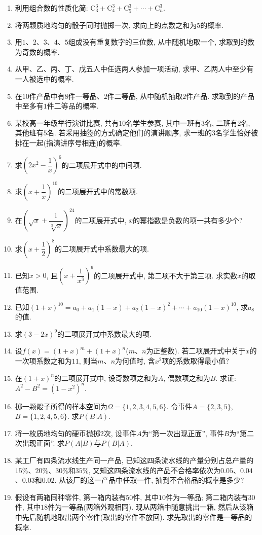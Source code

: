 \documentclass[10pt,a4paper]{article}
\begin{document}
\begin{enumerate}[1.]
\item 利用组合数的性质化简: $\mathrm{C}_3^3+\mathrm{C}_4^3+\mathrm{C}_5^3+\cdots+\mathrm{C}_n^3$.
\item 将两颗质地均匀的骰子同时抛掷一次, 求向上的点数之和为$5$的概率.
\item 用$1$、$2$、$3$、$4$、$5$组成没有重复数字的三位数, 从中随机地取一个, 求取到的数为奇数的概率.
\item 从甲、乙、丙、丁、戊五人中任选两人参加一项活动, 求甲、乙两人中至少有一人被选中的概率.
\item 在$10$件产品中有$8$件一等品、$2$件二等品, 从中随机抽取$2$件产品. 求取到的产品中至多有$1$件二等品的概率.
\item 某校高一年级举行演讲比赛, 共有$10$名学生参赛, 其中一班有$3$名, 二班有$2$名, 其他班有$5$名. 若采用抽签的方式确定他们的演讲顺序, 求一班的$3$名学生恰好被排在一起(指演讲序号相连)的概率.
\item 求$(2x^2-\dfrac 1x)^6$的二项展开式中的中间项.
\item 求$(x+\dfrac 1x)^{10}$的二项展开式中的常数项.
\item 在$(\sqrt x+\dfrac 1{\sqrt[3]x})^{24}$的二项展开式中, $x$的幂指数是负数的项一共有多少个? 
\item 求$(x+\dfrac 12)^8$的二项展开式中系数最大的项.
\item 已知$x>0$, 且$(x+\dfrac 1{x^3})^9$的二项展开式中, 第二项不大于第三项. 求实数$x$的取值范围.
\item 已知$(1+x)^{10}=a_0+a_1(1-x)+a_2(1-x)^2+\cdots+a_{10}(1-x)^{10}$, 求$a_8$的值.
\item 求$(3-2x)^9$的二项展开式中系数最大的项.
\item 设$f(x)=(1+x)^m+(1+x)^n$($m$、$n$为正整数). 若二项展开式中关于$x$的一次项系数之和为$11$, 则当$m$、$n$为何值时, 含$x^2$项的系数取得最小值? 
\item 在$(1+x)^n$的二项展开式中, 设奇数项之和为$A$, 偶数项之和为$B$. 求证: $A^2-B^2=(1-x^2)^n$.
\item 掷一颗骰子所得的样本空间为$\Omega=\{1, 2, 3, 4, 5, 6\}$. 令事件$A=\{2, 3, 5\}$, $B=\{1, 2, 4, 5, 6\}$. 求$P(B|A)$.
\item 将一枚质地均匀的硬币抛掷$2$次, 设事件$A$为``第一次出现正面'', 事件$B$为``第二次出现正面''. 求$P(A|B)$与$P(B|A)$.
\item 某工厂有四条流水线生产同一产品, 已知这四条流水线的产量分别占总产量的$15\%$、$20\%$、$30\%$和$35\%$, 又知这四条流水线的产品不合格率依次为$0.05$、$0.04$、$0.03$和$0.02$. 从该厂的这一产品中任取一件, 抽到不合格品的概率是多少? 
\item 假设有两箱同种零件, 第一箱内装有$50$件, 其中$10$件为一等品; 第二箱内装有$30$件, 其中$18$件为一等品(两箱外观相同). 现从两箱中随意挑出一箱, 然后从该箱中先后随机地取出两个零件(取出的零件不放回). 求先取出的零件是一等品的概率.

\end{enumerate}
\end{document}
